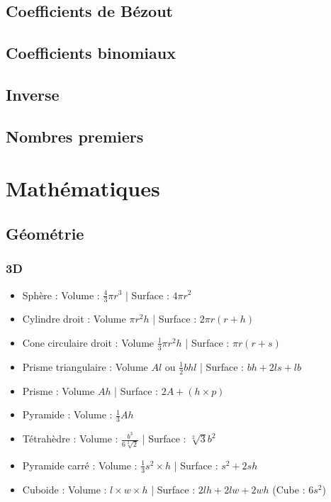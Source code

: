 \documentclass[8pt]{article}
\begin{document}
        \subsection{Coefficients de Bézout}
        {\scriptsize}
        \subsection{Coefficients binomiaux}
        {\scriptsize}
        \subsection{Inverse}
        {\scriptsize}
        \subsection{Nombres premiers}
        {\scriptsize}
    \section{Mathématiques}
        \subsection{Géométrie}
            \subsubsection{3D}
            \begin{itemize}
                \item Sphère : Volume : $\frac{4}{3}\pi r^{3}$ | Surface : $4\pi r^{2}$
                \item Cylindre droit : Volume $\pi r^{2} h$ | Surface : $2\pi r( r + h)$
                \item Cone circulaire droit : Volume $\frac{1}{3} \pi r^{2} h$ | Surface : $\pi r( r + s)$
                \item Prisme triangulaire : Volume $A  l$ ou $\frac{1}{2}bhl$ | Surface : $bh + 2ls + lb$
                \item Prisme : Volume $Ah$ | Surface : $2A + (h \times p)$
                \item Pyramide : Volume : $\frac{1}{3}Ah$
                \item Tétrahèdre : Volume : $\frac{b^{3}}{6  \sqrt[2]{2}}$ | Surface : $\sqrt[2]{3}b^{2}$
                \item Pyramide carré : Volume : $\frac{1}{3}s^{2}\times h$ | Surface : $s^{2} + 2sh$
                \item Cuboide : Volume : $l\times w \times h$ | Surface : $2lh + 2lw +2wh$ (Cube : $6s^{2}$)
            \end{itemize}
\end{document}
